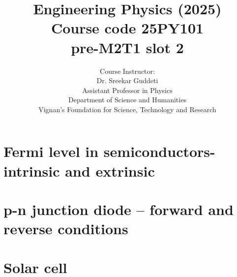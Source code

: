 \documentclass[aspectratio=1610, handout]{beamer}
\title[Engineering Physics]{Engineering Physics (2025) \\ Course code
	25PY101 \\ pre-M2T1 slot 2}
\author{Course Instructor:\\ 
	{\color{VignanBlue} Dr. Sreekar Guddeti}\\
	Assistant Professor in Physics\\
	Department of Science and Humanities \\
	{\color{VignanRed}Vignan's Foundation for Science, Technology and Research}
}
\newif\ifshowhidden
\begin{document}
	\begin{frame}[label=titleframe]
		\titlepage
	\end{frame}
	
	\section{Fermi level in semiconductors- intrinsic and extrinsic}
	
	
	\section{p-n junction diode -- forward and reverse conditions}
	
	\section{Solar cell}
	
\end{document}
